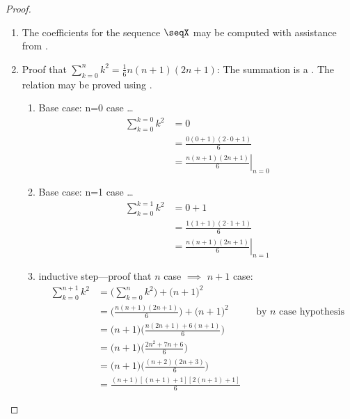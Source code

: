 \begin{proof}
\begin{enumerate}
  \item The coefficients for the sequence $\seqX$ may be computed with assistance from .

  \item Proof that $\sum_{k=0}^{n}k^2 = \frac{1}{6}n(n+1)(2n+1)$: The summation is a . \label{item:Nn_powersum}
        The relation may be proved using .
    \begin{enumerate}
      \item Base case: n=0 case \ldots
        \begin{align*}
          \sum_{k=0}^{k=0} k^2
            &= 0
          \\&= \frac{0(0+1)(2\cdot0+1)}{6}
          \\&= \left.\frac{n(n+1)(2n+1)}{6}\right|_{n=0}
        \end{align*}

      \item Base case: n=1 case \ldots
        \begin{align*}
          \sum_{k=0}^{k=1} k^2
            &= 0 + 1
          \\&= \frac{1(1+1)(2\cdot1+1)}{6}
          \\&= \left.\frac{n(n+1)(2n+1)}{6}\right|_{n=1}
        \end{align*}

      \item inductive step---proof that $n$ case $\implies$ $n+1$ case:
        \begin{align*}
          \sum_{k=0}^{n+1} k^2
            &= \Bigg(\sum_{k=0}^n k^2\Bigg) + \Bigg(n+1\Bigg)^2
          \\&= \Bigg(\frac{n(n+1)(2n+1)}{6}\Bigg) + \Bigg(n+1\Bigg)^2
            && \text{by $n$ case hypothesis}
          \\&= \Bigg(n+1\Bigg)\Bigg(\frac{n(2n+1)+6(n+1)}{6}\Bigg)
          \\&= \Bigg(n+1\Bigg)\Bigg(\frac{2n^2+7n+6}{6}\Bigg)
          \\&= \Bigg(n+1\Bigg)\Bigg(\frac{(n+2)(2n+3)}{6}\Bigg)
          \\&= \frac{(n+1)[(n+1)+1][2(n+1)+1]}{6}
        \end{align*}
  \end{enumerate}
\end{enumerate}
\end{proof}
